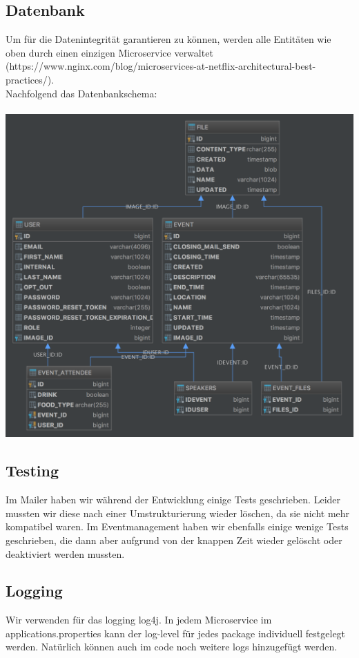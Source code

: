 \documentclass[11pt]{article} %
\begin{document}
\newpage
\subsection{Datenbank}
Um für die Datenintegrität garantieren zu können, werden alle Entitäten wie oben durch einen einzigen Microservice verwaltet (https://www.nginx.com/blog/microservices-at-netflix-architectural-best-practices/).
\\
Nachfolgend das Datenbankschema:
\\
\\
\includegraphics[width=1\textwidth]{dbSchema}
\\

\subsection{Testing}
Im Mailer haben wir während der Entwicklung einige Tests geschrieben. Leider mussten wir diese nach einer Umstrukturierung wieder löschen, da sie nicht mehr kompatibel waren. Im Eventmanagement haben wir ebenfalls einige wenige Tests geschrieben, die dann aber aufgrund von der knappen Zeit wieder gelöscht oder deaktiviert werden mussten.

\subsection{Logging}
Wir verwenden für das logging log4j. In jedem Microservice im applications.properties kann der log-level für jedes package individuell festgelegt werden. Natürlich können auch im code noch weitere logs hinzugefügt werden.
\end{document}
